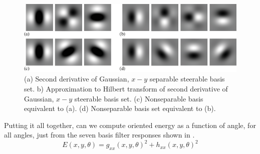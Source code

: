 \begin{figure}[t]
	\centerline{
		\includegraphics[width=1\linewidth]{figures/spatial_filter_sets/steer_quad_basis.eps}
	}
	\caption{(a) Second derivative of Gaussian, $x-y$
		separable steerable basis set. b) Approximation to Hilbert transform of second derivative of  Gaussian, $x-y$ steerable basis set. (c)  Nonseparable basis equivalent to (a). (d) Nonseparable basis set equivalent to (b).}
	\label{fig:steer_quad_basis}
\end{figure}


Putting it all together, can we compute oriented energy
as a function
of angle, for all angles, just from the seven basis filter responses shown in \fig{\ref{fig:steer_quad_basis}}.
\begin{equation}
	E(x,y,\theta) = g_{xx}(x,y,\theta)^2 + h_{xx}(x,y,\theta)^2
\end{equation}

%
%
%
%
%
%
%
%





